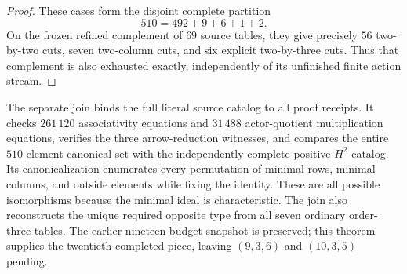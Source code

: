 \begin{proof}
These cases form the disjoint complete partition
\[
510=492+9+6+1+2.
\]
On the frozen refined complement of $69$ source tables, they
give precisely $56$ two-by-two cuts, seven two-column cuts,
and six explicit two-by-three cuts.  Thus that complement is
also exhausted exactly, independently of its unfinished
finite action stream.
\end{proof}

\begin{remark*}
The separate join
binds the full literal source catalog to all proof receipts.
It checks $261\,120$ associativity equations and $31\,488$
actor-quotient multiplication equations, verifies the three
arrow-reduction witnesses, and compares the entire $510$-element
canonical set with the independently complete positive-$H^2$
catalog.  Its canonicalization enumerates every permutation of
minimal rows, minimal columns, and outside elements while fixing
the identity.  These are all possible isomorphisms because the
minimal ideal is characteristic.  The join also reconstructs
the unique required opposite type from all seven ordinary
order-three tables.  The earlier nineteen-budget snapshot is
preserved; this theorem supplies the twentieth completed piece,
leaving $(9,3,6)$ and $(10,3,5)$ pending.
\end{remark*}
